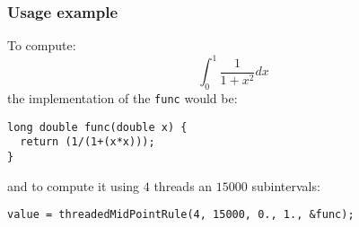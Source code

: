 \subsubsection{Usage example}

To compute:
%
\begin{displaymath}
\int_{0}^{1} \frac{1}{1+x^2} dx
\end{displaymath}
%
the implementation of the \texttt{func} would be:
%
\begin{verbatim}
long double func(double x) {
  return (1/(1+(x*x)));
}
\end{verbatim}
%
and to compute it using $4$ threads an $15000$ subintervals:
%
\begin{verbatim}
value = threadedMidPointRule(4, 15000, 0., 1., &func);  
\end{verbatim}
